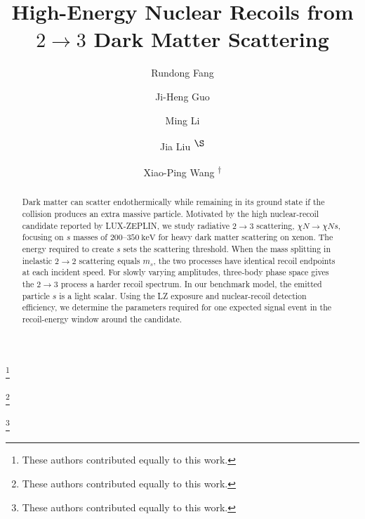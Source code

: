 \documentclass[prd,showpacs,preprintnumbers,amsmath,amssymb,twocolumn,
superscriptaddress,notitlepage]{revtex4-2}
\begin{document}
\title{High-Energy Nuclear Recoils from $2\to3$ Dark Matter Scattering}

\author{Rundong Fang}
\thanks{These authors contributed equally to this work.}

\author{Ji-Heng Guo$ $}
\thanks{These authors contributed equally to this work.}

\author{Ming Li }
\thanks{These authors contributed equally to this work.}

\author{Jia Liu 
\protect\textsuperscript{$\S$}}

\author{Xiao-Ping Wang 
\protect\textsuperscript{$\dagger$}}




\begin{abstract}
Dark matter can scatter endothermically while remaining in its ground
state if the collision produces an extra massive particle.
Motivated by the high nuclear-recoil candidate reported
by LUX-ZEPLIN, we study radiative $2\to3$ scattering,
$\chi N\to\chi N s$, focusing on $s$ masses of
$200$--$350~\mathrm{keV}$ for heavy dark matter scattering on xenon.
The energy required to create $s$ sets the scattering threshold.
When the mass splitting in inelastic $2\to2$ scattering equals $m_s$,
the two processes have identical recoil endpoints at each incident speed.
For slowly varying amplitudes, three-body phase space gives the
$2\to 3$ process a harder recoil spectrum.
In our benchmark model, the emitted particle $s$ is a light scalar.
Using the LZ exposure and nuclear-recoil detection efficiency,
we determine the parameters required for one expected signal event
in the recoil-energy window around the candidate.
\end{abstract}


\maketitle
\end{document}
